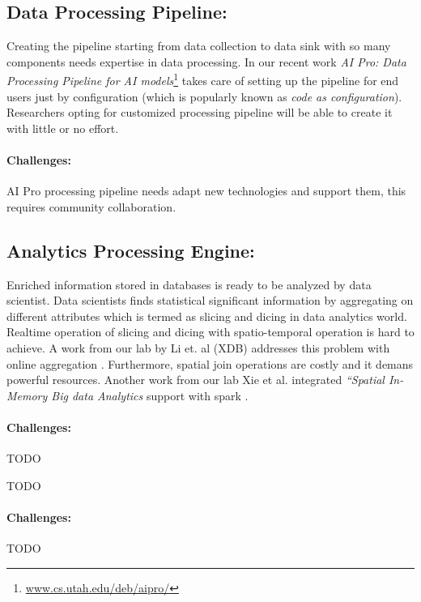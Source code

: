 \subsection{Data Processing Pipeline:}
Creating the pipeline starting from data collection to data sink with so many components needs expertise in data processing. In our recent work {\em AI Pro: Data Processing Pipeline for AI models}\footnote{\href{http://www.cs.utah.edu/~deb/aipro/}{www.cs.utah.edu/deb/aipro/}} takes care of setting up the pipeline for end users just by configuration (which is popularly known as {\em code as configuration}).
Researchers opting for customized processing pipeline will be able to create it with little or no effort.

\vspace{-2mm}
\paragraph{Challenges:}
AI Pro processing pipeline needs adapt new technologies and support them, this requires community collaboration.

\subsection{Analytics Processing Engine:}
Enriched information stored in databases is ready to be analyzed by data scientist. Data scientists finds  statistical significant information by aggregating on different attributes which is termed as slicing and dicing in data analytics world. Realtime operation of slicing and dicing with spatio-temporal operation is hard to achieve. A work from our lab by Li et. al (XDB) addresses this problem with online aggregation \cite{li2017wander}. Furthermore, spatial join operations are costly and it demans powerful resources. Another work from our lab Xie et al. integrated {\em ``Spatial In-Memory Big data Analytics} support with spark \cite{xie2016simba}.


\vspace{-2mm}
\paragraph{Challenges:}
TODO

TODO

\vspace{-2mm}
\paragraph{Challenges:}
TODO

